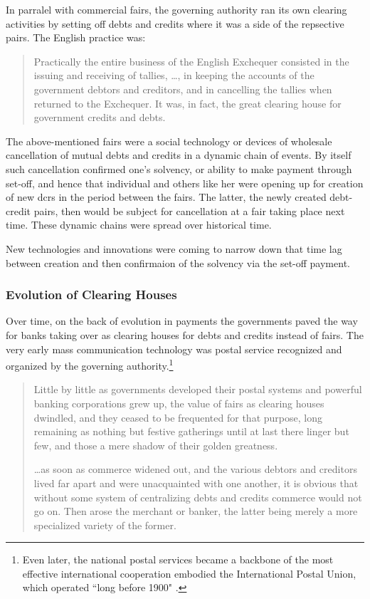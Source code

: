 In parralel with commercial fairs, the governing authority ran its own clearing activities by setting off debts and credits where it was a side of the repsective pairs. The English practice was:

\begin{quote}
Practically the entire business of the English Exchequer consisted in the issuing and receiving of tallies, \dots, in keeping the accounts of the government debtors and creditors, and in cancelling the tallies when returned to the Exchequer. It was, in fact, the great clearing house for government credits and debts.~\citep[p.~398]{innes1913}
\end{quote}

The above-mentioned fairs were a social technology or devices of wholesale cancellation of mutual debts and credits in a dynamic chain of events. By itself such cancellation confirmed one's solvency, or ability to make payment through set-off, and hence that individual and others like her were opening up for creation of new \acfp{dcr} in the period between the fairs. The latter, the newly created debt-credit pairs, then would be subject for cancellation at a fair taking place next time. These dynamic chains were spread over historical time. 

New technologies and innovations were coming to narrow down that time lag between creation and then confirmaion of the solvency via the set-off payment. 

\subsubsection{Evolution of Clearing Houses}\label{sec:evolution}

Over time, on the back of evolution in payments the governments paved the way for banks taking over as clearing houses for debts and credits instead of fairs. The very early mass communication technology was postal service recognized and organized by the governing authority.\footnote{Even later, the national postal services became a backbone of the most effective international cooperation embodied the International Postal Union, which operated ``long before 1900" \citep[p.~2]{beyen1949}.}

\begin{quote}
Little by little as governments developed their postal systems and powerful banking corporations grew up, the value of fairs as clearing houses dwindled, and they ceased to be frequented for that purpose, long remaining as nothing but festive gatherings until at last there linger but few, and those a mere shadow of their golden greatness.~\citep[p.~397]{innes1913} \par
\dots as soon as commerce widened out, and the various debtors and creditors lived far apart and  were unacquainted with one another, it is obvious that without some system of centralizing debts and credits commerce would not go on. Then arose the merchant or banker, the latter being merely a more specialized variety of the former.~\citep[p.~403]{innes1913}
\end{quote}
 
